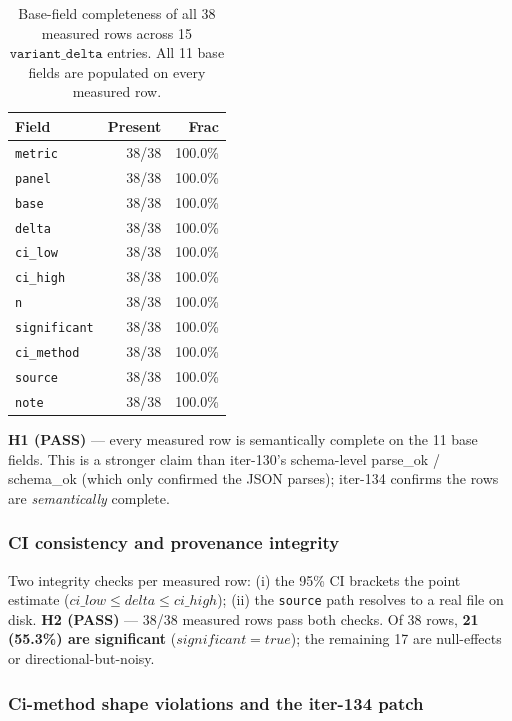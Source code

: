 \begin{table}[h]
\centering
\small
\begin{tabular}{lrr}
\toprule
\textbf{Field} & \textbf{Present} & \textbf{Frac} \\
\midrule
\texttt{metric}        & 38/38 & 100.0\% \\
\texttt{panel}         & 38/38 & 100.0\% \\
\texttt{base}          & 38/38 & 100.0\% \\
\texttt{delta}         & 38/38 & 100.0\% \\
\texttt{ci\_low}       & 38/38 & 100.0\% \\
\texttt{ci\_high}      & 38/38 & 100.0\% \\
\texttt{n}             & 38/38 & 100.0\% \\
\texttt{significant}   & 38/38 & 100.0\% \\
\texttt{ci\_method}    & 38/38 & 100.0\% \\
\texttt{source}        & 38/38 & 100.0\% \\
\texttt{note}          & 38/38 & 100.0\% \\
\bottomrule
\end{tabular}
\caption{Base-field completeness of all 38 measured rows across 15
$\texttt{variant\_delta}$ entries. All 11 base fields are populated on
every measured row.}
\label{tab:p6-iter134-base-fields}
\end{table}

\textbf{H1 (PASS)} --- every measured row is semantically complete on the
11 base fields. This is a stronger claim than iter-130's
schema-level parse\_ok / schema\_ok (which only confirmed the JSON
parses); iter-134 confirms the rows are \emph{semantically} complete.

\subsubsection{CI consistency and provenance integrity}
\label{sec:p6-iter134-integrity}

Two integrity checks per measured row: (i) the 95\% CI brackets the point
estimate ($\mathit{ci\_low} \leq \mathit{delta} \leq \mathit{ci\_high}$);
(ii) the \texttt{source} path resolves to a real file on disk.
\textbf{H2 (PASS)} --- 38/38 measured rows pass both checks. Of 38 rows,
\textbf{21 (55.3\%) are significant} ($\mathit{significant} = \mathit{true}$);
the remaining 17 are null-effects or directional-but-noisy.

\subsubsection{Ci-method shape violations and the iter-134 patch}
\label{sec:p6-iter134-ci-method-shape}


